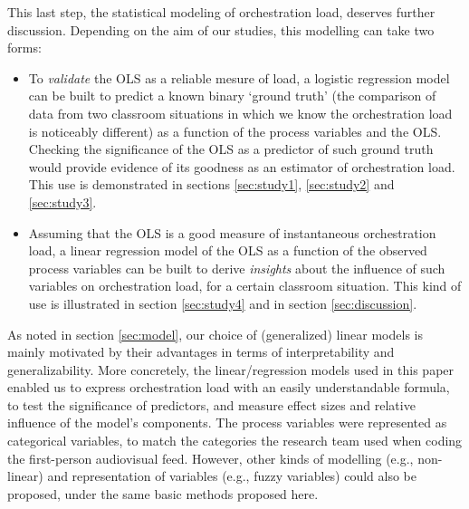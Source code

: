\documentclass[10pt,journal,compsoc]{IEEEtran}
\begin{document}
This last step, the statistical modeling of orchestration load, deserves further discussion. Depending on the aim of our studies, this modelling can take two forms:

\begin{itemize}
\item To \textit{validate} the OLS as a reliable mesure of load, a logistic regression model can be built to predict a known binary `ground truth' (the comparison of data from two classroom situations in which we know the orchestration load is noticeably different) as a function of the process variables and the OLS. Checking the significance of the OLS as a predictor of such ground truth would provide evidence of its goodness as an estimator of orchestration load. This use is demonstrated in sections \ref{sec:study1}, \ref{sec:study2} and \ref{sec:study3}.
\item Assuming that the OLS is a good measure of instantaneous orchestration load, a linear regression model of the OLS as a function of the observed process variables can be built to derive \textit{insights} about the influence of such variables on orchestration load, for a certain classroom situation. This kind of use is illustrated in section \ref{sec:study4} and in section \ref{sec:discussion}.
\end{itemize}

As noted in section \ref{sec:model}, our choice of (generalized) linear models is mainly motivated by their advantages in terms of interpretability and generalizability. More concretely, the linear/regression models used in this paper enabled us to express orchestration load with an easily understandable formula, to test the significance of predictors, and measure effect sizes and relative influence of the model's components. The process variables were represented as categorical variables, to match the categories the research team used when coding the first-person audiovisual feed. However, other kinds of modelling (e.g., non-linear) and representation of variables (e.g., fuzzy variables) could also be proposed, under the same basic methods proposed here.
\end{document}
